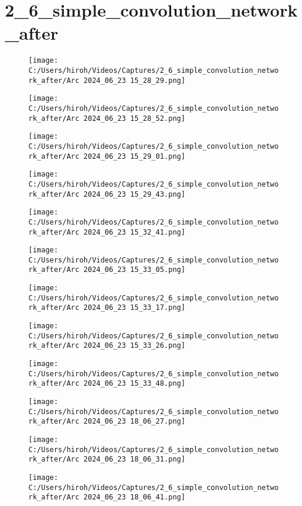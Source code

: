 \documentclass{ltjsarticle}
\begin{document}
\section{2\_6\_simple\_convolution\_network\_after}
\begin{figure}[htbp]
  \centering
  \texttt{[image: C:/Users/hiroh/Videos/Captures/2\_6\_simple\_convolution\_network\_after/Arc 2024\_06\_23 15\_28\_29.png]}
\end{figure}
\begin{figure}[htbp]
  \centering
  \texttt{[image: C:/Users/hiroh/Videos/Captures/2\_6\_simple\_convolution\_network\_after/Arc 2024\_06\_23 15\_28\_52.png]}
\end{figure}
\begin{figure}[htbp]
  \centering
  \texttt{[image: C:/Users/hiroh/Videos/Captures/2\_6\_simple\_convolution\_network\_after/Arc 2024\_06\_23 15\_29\_01.png]}
\end{figure}
\begin{figure}[htbp]
  \centering
  \texttt{[image: C:/Users/hiroh/Videos/Captures/2\_6\_simple\_convolution\_network\_after/Arc 2024\_06\_23 15\_29\_43.png]}
\end{figure}
\begin{figure}[htbp]
  \centering
  \texttt{[image: C:/Users/hiroh/Videos/Captures/2\_6\_simple\_convolution\_network\_after/Arc 2024\_06\_23 15\_32\_41.png]}
\end{figure}
\begin{figure}[htbp]
  \centering
  \texttt{[image: C:/Users/hiroh/Videos/Captures/2\_6\_simple\_convolution\_network\_after/Arc 2024\_06\_23 15\_33\_05.png]}
\end{figure}
\begin{figure}[htbp]
  \centering
  \texttt{[image: C:/Users/hiroh/Videos/Captures/2\_6\_simple\_convolution\_network\_after/Arc 2024\_06\_23 15\_33\_17.png]}
\end{figure}
\begin{figure}[htbp]
  \centering
  \texttt{[image: C:/Users/hiroh/Videos/Captures/2\_6\_simple\_convolution\_network\_after/Arc 2024\_06\_23 15\_33\_26.png]}
\end{figure}
\begin{figure}[htbp]
  \centering
  \texttt{[image: C:/Users/hiroh/Videos/Captures/2\_6\_simple\_convolution\_network\_after/Arc 2024\_06\_23 15\_33\_48.png]}
\end{figure}
\begin{figure}[htbp]
  \centering
  \texttt{[image: C:/Users/hiroh/Videos/Captures/2\_6\_simple\_convolution\_network\_after/Arc 2024\_06\_23 18\_06\_27.png]}
\end{figure}
\begin{figure}[htbp]
  \centering
  \texttt{[image: C:/Users/hiroh/Videos/Captures/2\_6\_simple\_convolution\_network\_after/Arc 2024\_06\_23 18\_06\_31.png]}
\end{figure}
\begin{figure}[htbp]
  \centering
  \texttt{[image: C:/Users/hiroh/Videos/Captures/2\_6\_simple\_convolution\_network\_after/Arc 2024\_06\_23 18\_06\_41.png]}
\end{figure}
\end{document}
